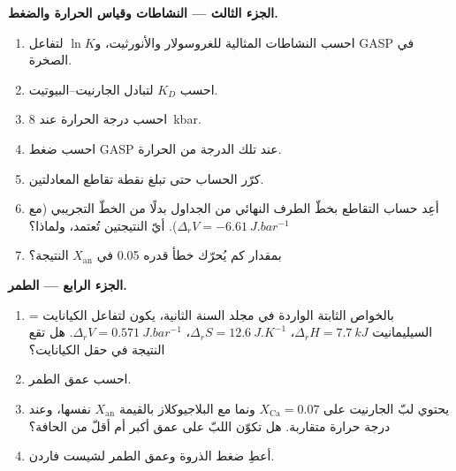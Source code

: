 \begin{problem}
\medskip\noindent\textbf{الجزء الثالث --- النشاطات وقياس الحرارة والضغط.}
\begin{enumerate}[resume]
  \item احسب النشاطات المثالية للغروسولار والأنورثيت، و$\ln K$
        لتفاعل GASP في الصخرة.
  \item احسب $K_D$ لتبادل الجارنيت--البيوتيت.
  \item احسب درجة الحرارة عند \qty{8}{kbar}.
  \item احسب ضغط GASP عند تلك الدرجة من الحرارة.
  \item كرّر الحساب حتى تبلغ نقطة تقاطع المعادلتين.
  \item أعِد حساب التقاطع بخطّ الطرف النهائي من الجداول بدلًا
        من الخطّ التجريبي (مع $\Delta_rV = \qty{-6.61}{J.bar^{-1}}$).
        أيّ النتيجتين تُعتمد، ولماذا؟
  \item بمقدار كم يُحرّك خطأ قدره 0.05 في $X_{\text{an}}$
        النتيجة؟
\end{enumerate}

\medskip\noindent\textbf{الجزء الرابع --- الطمر.}
\begin{enumerate}[resume]
  \item بالخواص الثابتة الواردة في مجلد السنة الثانية، يكون لتفاعل الكيانايت =
        السيليمانيت $\Delta_rH = \qty{7.7}{kJ}$، $\Delta_rS =
        \qty{12.6}{J.K^{-1}}$، $\Delta_rV = \qty{0.571}{J.bar^{-1}}$. هل
        تقع النتيجة في حقل الكيانايت؟
  \item احسب عمق الطمر.
  \item يحتوي لبّ الجارنيت على $X_{\text{Ca}} = 0.07$ ونما مع البلاجيوكلاز
        بالقيمة $X_{\text{an}}$ نفسها، وعند درجة حرارة متقاربة.
        هل تكوّن اللبّ على عمق أكبر أم أقلّ من الحافة؟
  \item أعطِ ضغط الذروة وعمق الطمر لشيست فاردن.
\end{enumerate}
\end{problem}
